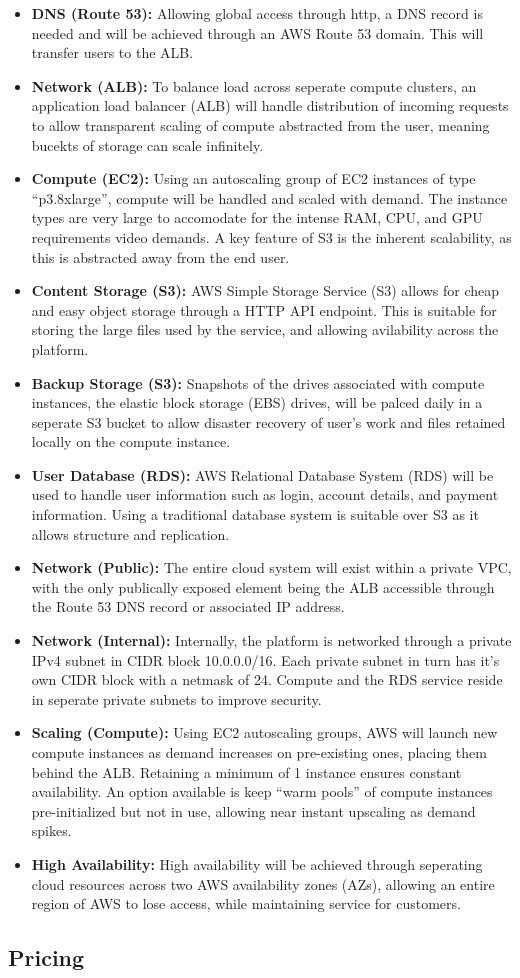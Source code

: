 \begin{itemize}
    \item \textbf{DNS (Route 53):} Allowing global access through http, a DNS record is needed and will be achieved through an AWS Route 53 domain. This will transfer users to the ALB.
    \item \textbf{Network (ALB):} To balance load across seperate compute clusters, an application load balancer (ALB) will handle distribution of incoming requests to allow transparent scaling of compute abstracted from the user, meaning bucekts of storage can scale infinitely.
    \item \textbf{Compute (EC2):} Using an autoscaling group of EC2 instances of type ``p3.8xlarge'', compute will be handled and scaled with demand. The instance types are very large to accomodate for the intense RAM, CPU, and GPU requirements video demands. A key feature of S3 is the inherent scalability, as this is abstracted away from the end user.
    \item \textbf{Content Storage (S3):} AWS Simple Storage Service (S3) allows for cheap and easy object storage through a HTTP API endpoint. This is suitable for storing the large files used by the service, and allowing avilability across the platform.
    \item \textbf{Backup Storage (S3):} Snapshots of the drives associated with compute instances, the elastic block storage (EBS) drives, will be palced daily in a seperate S3 bucket to allow disaster recovery of user's work and files retained locally on the compute instance.
    \item \textbf{User Database (RDS):} AWS Relational Database System (RDS) will be used to handle user information such as login, account details, and payment information. Using a traditional database system is suitable over S3 as it allows structure and replication.
    \item \textbf{Network (Public):} The entire cloud system will exist within a private VPC, with the only publically exposed element being the ALB accessible through the Route 53 DNS record or associated IP address.
    \item \textbf{Network (Internal):} Internally, the platform is networked through a private IPv4 subnet in CIDR block 10.0.0.0/16. Each private subnet in turn has it's own CIDR block with a netmask of 24. Compute and the RDS service reside in seperate private subnets to improve security.
    \item \textbf{Scaling (Compute):} Using EC2 autoscaling groups, AWS will launch new compute instances as demand increases on pre-existing ones, placing them behind the ALB. Retaining a minimum of 1 instance ensures constant availability. An option available is keep ``warm pools'' of compute instances pre-initialized but not in use, allowing near instant upscaling as demand spikes.
    \item \textbf{High Availability:} High availability will be achieved through seperating cloud resources across two AWS availability zones (AZs), allowing an entire region of AWS to lose access, while maintaining service for customers.
\end{itemize}

\subsection{Pricing}

